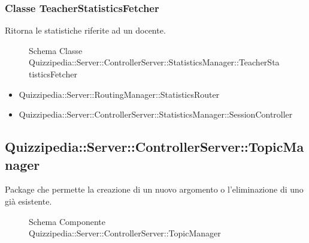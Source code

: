 \subsubsection{Classe TeacherStatisticsFetcher}
Ritorna le statistiche riferite ad un docente.
\begin{figure}[H]
\centering
\noindent{}
\caption{Schema Classe Quizzipedia::Server::ControllerServer::StatisticsManager::TeacherStatisticsFetcher}
\end{figure}
\begin{itemize}
\item Quizzipedia::Server::RoutingManager::StatisticsRouter
\end{itemize}
\begin{itemize}
\item Quizzipedia::Server::ControllerServer::StatisticsManager::SessionController
\end{itemize}
\subsection{Quizzipedia::Server::ControllerServer::TopicManager}
Package che permette la creazione di un nuovo argomento o l'eliminazione di uno già esistente.
\begin{figure}[H]
\centering
\noindent{}
\caption[Quizzipedia::Server::ControllerServer::TopicManager]{Schema Componente Quizzipedia::Server::ControllerServer::TopicManager}
\end{figure}
